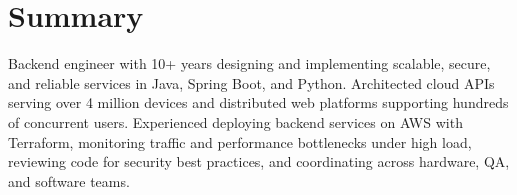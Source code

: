 \section{Summary}
Backend engineer with 10+ years designing and implementing scalable, secure, and reliable services in Java, Spring Boot, and Python. Architected cloud APIs serving over 4 million devices and distributed web platforms supporting hundreds of concurrent users. Experienced deploying backend services on AWS with Terraform, monitoring traffic and performance bottlenecks under high load, reviewing code for security best practices, and coordinating across hardware, QA, and software teams.
